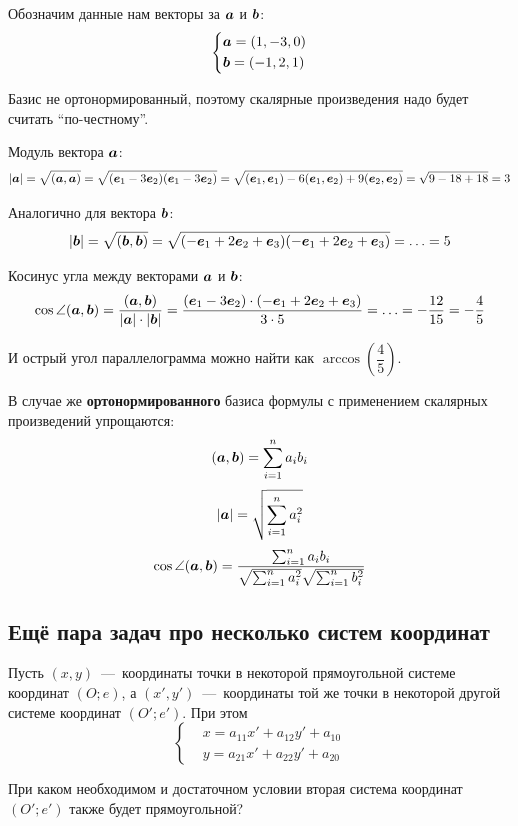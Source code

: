 \documentclass[a4paper,12pt]{article}
\begin{document}
  \begin{solution}
    Обозначим данные нам векторы за $\boldsymbol a$ и $\boldsymbol b$:
    \[
      \left\{
        \begin{aligned}
          &\boldsymbol a = (1, -3, 0)\\
          &\boldsymbol b = (-1, 2, 1)
        \end{aligned}
      \right.
    \]
    
    Базис не ортонормированный, поэтому скалярные произведения надо будет считать ``по-честному''.
    
    Модуль вектора $\boldsymbol a$:
    \[
      |\boldsymbol a| = \sqrt{(\boldsymbol a, \boldsymbol a)} = \sqrt{(\boldsymbol e_1 - 3\boldsymbol e_2)(\boldsymbol e_1 - 3\boldsymbol e_2)}
        = \sqrt{(\boldsymbol e_1, \boldsymbol e_1) - 6(\boldsymbol e_1, \boldsymbol e_2) + 9(\boldsymbol e_2, \boldsymbol e_2)}
        = \sqrt{9 - 18 + 18} = 3
    \]
    
    Аналогично для вектора $\boldsymbol b$:
    \[
      |\boldsymbol b| = \sqrt{(\boldsymbol b, \boldsymbol b)} = \sqrt{(-\boldsymbol e_1 + 2\boldsymbol e_2 + \boldsymbol e_3)(-\boldsymbol e_1 + 2\boldsymbol e_2 + \boldsymbol e_3)}
        = \ldots = 5
    \]
    
    Косинус угла между векторами $\boldsymbol a$ и $\boldsymbol b$:
    \[
      \cos\angle(\boldsymbol a, \boldsymbol b) = \frac{(\boldsymbol a, \boldsymbol b)}{|\boldsymbol a| \cdot |\boldsymbol b|}
        = \frac{(\boldsymbol e_1 - 3\boldsymbol e_2) \cdot (-\boldsymbol e_1 + 2\boldsymbol e_2 + \boldsymbol e_3)}{3 \cdot 5}
        = \ldots = -\frac{12}{15} = -\frac{4}{5}
    \]
    
    И острый угол параллелограмма можно найти как $\arccos{\left(\dfrac{4}{5}\right)}$.
  \end{solution}
  
  В случае же \textbf{ортонормированного} базиса формулы с применением скалярных произведений упрощаются:
  \[
    (\boldsymbol a, \boldsymbol b) = \sum_{i=1}^n a_i b_i
  \]
  \[
    |\boldsymbol a| = \sqrt{\sum_{i=1}^n a_i^2}
  \]
  \[
    \cos\angle(\boldsymbol a, \boldsymbol b) = \frac{\sum_{i=1}^n a_i b_i}{\sqrt{\sum_{i=1}^n a_i^2} \sqrt{\sum_{i=1}^n b_i^2}}
  \]
  
  
  
  
  \subsection{Ещё пара задач про несколько систем координат}
  
  \begin{problem}[4.23]
    Пусть $(x, y)$~---~координаты точки в некоторой прямоугольной системе координат $(O; e)$, а $(x', y')$~---~координаты той же точки в некоторой другой системе координат $(O'; e')$.
    При этом
    \[
      \left\{
        \begin{aligned}
          &x = a_{11} x' + a_{12} y' + a_{10}\\
          &y = a_{21} x' + a_{22} y' + a_{20}
        \end{aligned}
      \right.
    \]
    
    При каком необходимом и достаточном условии вторая система координат $(O'; e')$ также будет прямоугольной?
  \end{problem}
  
\end{document}
